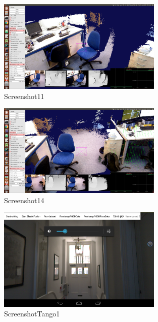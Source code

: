\documentclass[12pt,twoside]{article}
\begin{document}
\begin{figure}[h]
    \centering
    \includegraphics[width=0.7\textwidth]{figures/Screenshot11}
    \caption{Screenshot11}
    \label{fig:Screenshot11}
\end{figure}


\begin{figure}[h]
    \centering
    \includegraphics[width=0.7\textwidth]{figures/Screenshot14}
    \caption{Screenshot14}
    \label{fig:Screenshot14}
\end{figure}



\begin{figure}[h]
    \centering
    \includegraphics[width=0.7\textwidth]{figures/ScreenshotTango1}
    \caption{ScreenshotTango1}
    \label{fig:ScreenshotTango1}
\end{figure}
\end{document}
